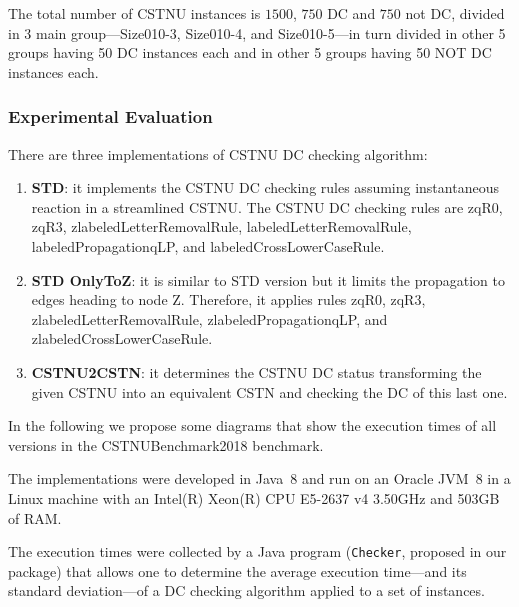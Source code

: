 \documentclass[a4paper,11pt]{article}
\begin{document}
The total number of CSTNU instances is $1500$, $750$ DC and $750$ not DC, divided in 3 main group---Size010-3, Size010-4, and Size010-5---in turn divided in other 5 groups having 50 DC instances each and in other 5 groups having 50 NOT DC instances each.

  
\subsubsection{Experimental Evaluation}

There are three implementations of CSTNU DC checking algorithm:
\begin{enumerate}
	\item \textbf{STD}: it implements the CSTNU DC checking rules assuming instantaneous reaction in a streamlined CSTNU. The CSTNU DC checking rules are zqR0, zqR3, zlabeledLetterRemovalRule,
	labeledLetterRemovalRule, labeledPropagationqLP, and labeledCrossLowerCaseRule. 
	
	\item \textbf{STD OnlyToZ}: it is similar to STD version but it limits the propagation to edges heading to node Z. Therefore, it applies rules zqR0, zqR3, zlabeledLetterRemovalRule,
	zlabeledPropagationqLP, and zlabeledCrossLowerCaseRule. 
	
	\item \textbf{CSTNU2CSTN}: it determines the CSTNU DC status transforming the given CSTNU into an equivalent CSTN and checking the DC of this last one.
\end{enumerate}
In the following we propose some diagrams that show the execution times of all versions in the CSTNUBenchmark2018 benchmark.

The implementations were developed in Java~8 and run on an Oracle JVM~8 in a Linux machine with an Intel(R) Xeon(R) CPU E5-2637 v4 \@ 3.50GHz and 503GB of RAM.

The execution times were collected by a Java program (\texttt{Checker}, proposed in our package) that allows one to determine the average execution time---and its standard deviation---of a DC checking algorithm applied to a set of instances.
\end{document}
